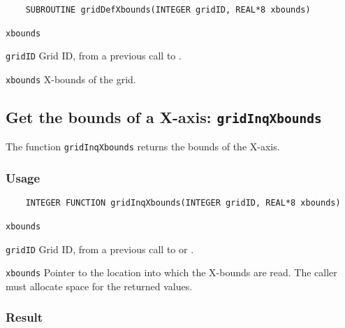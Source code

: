\begin{verbatim}
    SUBROUTINE gridDefXbounds(INTEGER gridID, REAL*8 xbounds)
\end{verbatim}

\hspace*{4mm}\begin{minipage}[]{15cm}
\begin{deflist}{\texttt{xbounds}\ }
\item[\texttt{gridID}]
Grid ID, from a previous call to {}.
\item[\texttt{xbounds}]
X-bounds of the grid.

\end{deflist}
\end{minipage}


\subsection{Get the bounds of a X-axis: \texttt{gridInqXbounds}}
\label{gridInqXbounds}

The function {\texttt{gridInqXbounds}} returns the bounds of the X-axis.

\subsubsection*{Usage}

\begin{verbatim}
    INTEGER FUNCTION gridInqXbounds(INTEGER gridID, REAL*8 xbounds)
\end{verbatim}

\hspace*{4mm}\begin{minipage}[]{15cm}
\begin{deflist}{\texttt{xbounds}\ }
\item[\texttt{gridID}]
Grid ID, from a previous call to {} or {}.
\item[\texttt{xbounds}]
Pointer to the location into which the X-bounds are read.
                    The caller must allocate space for the returned values.

\end{deflist}
\end{minipage}

\subsubsection*{Result}

